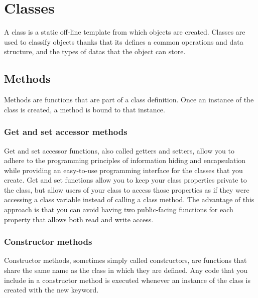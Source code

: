 \section{Classes}

A class is a static 
off-line 
template from which objects are 
created. Classes are used 
to classify objects thanks 
that its defines a 
common operations 
and data structure, 
and the types of 
datas that the object can 
store.


\subsection{Methods}
Methods are functions that are part of a class 
definition. Once an instance of the class is created, 
a method is bound to that instance.

	\subsubsection{Get and set accessor methods}
	Get and set accessor functions, also called getters 
	and setters, allow you to adhere to the programming principles of 
	information hiding and encapsulation while providing an 
	easy-to-use programming interface for the classes that you 
	create. Get and set functions allow you to keep your class 
	properties private to the class, but allow users of your class 
	to access those properties as if they were accessing a 
	class variable instead of calling a class method. 
	The advantage of this approach is that you can avoid 
	having two public-facing functions for each property 
	that allows both read and write access.
	
	\subsubsection{Constructor methods}
	Constructor methods, sometimes simply called constructors, 
	are functions that share the same name as the class in 
	which they are defined. Any code that you include in 
	a constructor method is executed whenever an instance of the 
	class is created with the  new  keyword.
